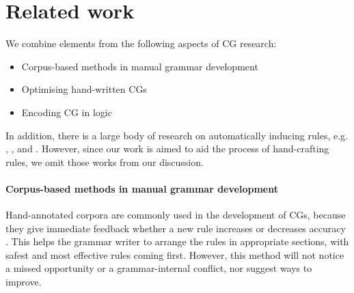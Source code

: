 






\section{Related work}
\label{sec:prev}


We combine elements from the following aspects of CG research:

\begin{itemize}
\item Corpus-based methods in manual grammar development \cite{voutilainen2004}
\item Optimising hand-written CGs~\cite{bick2013tuning}
\item Encoding CG in logic \cite{lager98,lager_nivre01,listenmaa_claessen2015}
\end{itemize}

In addition, there is a large body of research on automatically
inducing rules, e.g. , ,
 and .
However, since our work is aimed to aid the process of hand-crafting rules, we omit those works from our discussion.


\paragraph{Corpus-based methods in manual grammar development}

Hand-annotated corpora are commonly used in the development of CGs, because they give immediate feedback whether a new rule increases or decreases accuracy \cite{voutilainen2004}.
This helps the grammar writer to arrange the rules in appropriate sections, with safest and most effective rules coming first.
However, this method will not notice a missed opportunity or a grammar-internal conflict, nor suggest ways to improve.

